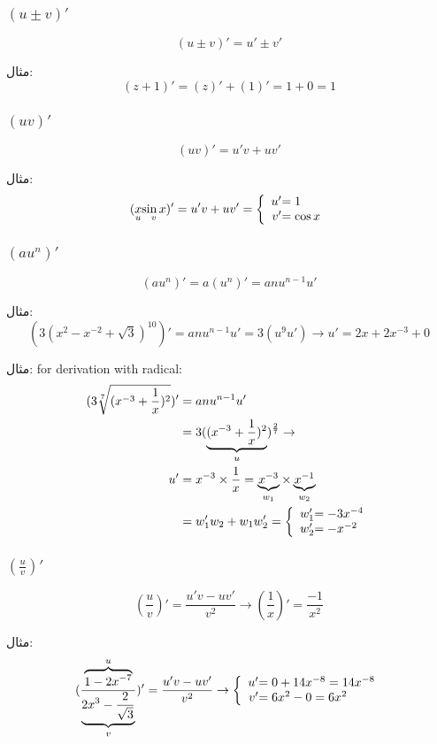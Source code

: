 \subsubsection{$(u \pm v)'$}
\[ (u \pm v)' = u' \pm v' \]

مثال:
\[ (z + 1)' = (z)' + (1)' = 1 + 0 = 1 \]

\subsubsection{$(uv)'$}
\[ (uv)' = u'v + uv' \]

مثال:
\begin{align*}
(\underset{u}{x}\underset{v}{\sin x})' = u'v + uv' = 
\left\lbrace
\begin{array}{r@{}l}
	u' &= 1 \\
	v' &= \cos x
\end{array}
\right.
\end{align*}

\subsubsection{$(au^n)'$}
\[ (au^n)' = a(u^n)' = anu^{n-1}u' \]

مثال:
\[ (3(x^2-x^{-2}+\sqrt{3})^{10})' = anu^{n-1}u' = 3(u^9u') \to u' = 2x +2x^{-3} + 0 \]

مثال: for derivation with radical:
\begin{align*}
(3\sqrt[7]{(x^{-3}+\frac{1}{x})^2})' &= anu^{n-1}u' \\
&= 3(\underbrace{(x^{-3}+\frac{1}{x})^2}_u)^{\frac{2}{7}} \to \\
u' &= x^{-3}\times\frac{1}{x} =
\underbrace{x^{-3}}_{w_1} \times \underbrace{x^{-1}}_{w_2} \\
&= w_1'w_2+w_1w_2' = 
\left\lbrace
\begin{array}{r@{}l}
	w_1' &= -3x^{-4} \\
	w_2' &= -x^{-2}
\end{array}
\right.
\end{align*}

\subsubsection{$(\frac{u}{v})'$}
\[ (\frac{u}{v})' = \frac{u'v - uv'}{v^2} \to (\frac{1}{x})' = \frac{-1}{x^2} \]

مثال:
\begin{align*}
(\frac{\overbrace{1-2x^{-7}}^u}{\underbrace{2x^3-\frac{2}{\sqrt{3}}}_v})' = \frac{u'v - uv'}{v^2} \to
\left\lbrace
\begin{array}{r@{}l}
	u' &= 0 + 14x^{-8} = 14x^{-8} \\
	v' &= 6x^2-0 = 6x^2
\end{array}
\right.
\end{align*}


